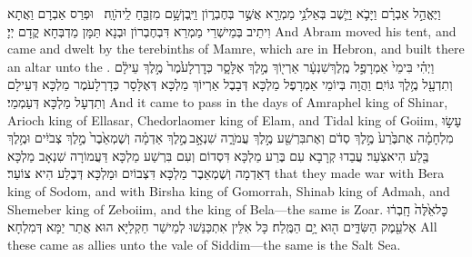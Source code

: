 {וַיֶּאֱהַ֣ל אַבְרָ֗ם וַיָּבֹ֛א וַיֵּ֛שֶׁב בְּאֵלֹנֵ֥י מַמְרֵ֖א אֲשֶׁ֣ר בְּחֶבְר֑וֹן וַיִּֽבֶן\maqqaf שָׁ֥ם מִזְבֵּ֖חַ לַֽיהֹוָֽה׃ \petucha }
{וּפְרַס אַבְרָם וַאֲתָא וִיתֵיב בְּמֵישְׁרֵי מַמְרֵא דִּבְחֶבְרוֹן וּבְנָא תַּמָּן מַדְבְּחָא קֳדָם יְיָ׃}
{And Abram moved his tent, and came and dwelt by the terebinths of Mamre, which are in Hebron, and built there an altar unto the \lord.}{}
\newperek
\newseder
{}%
{וַיְהִ֗י בִּימֵי֙ אַמְרָפֶ֣ל מֶֽלֶךְ\maqqaf שִׁנְעָ֔ר אַרְי֖וֹךְ מֶ֣לֶךְ אֶלָּסָ֑ר כְּדׇרְלָעֹ֙מֶר֙ מֶ֣לֶךְ עֵילָ֔ם וְתִדְעָ֖ל מֶ֥לֶךְ גּוֹיִֽם׃}
{וַהֲוָה בְּיוֹמֵי אַמְרָפֶל מַלְכָּא דְּבָבֶל אַרְיוֹךְ מַלְכָּא דְּאֶלָּסָר כְּדָרְלָעֹמֶר מַלְכָּא דְּעֵילָם וְתִדְעָל מַלְכָּא דְּעַמְמֵי׃}
{And it came to pass in the days of Amraphel king of Shinar, Arioch king of Ellasar, Chedorlaomer king of Elam, and Tidal king of Goiim,}{}
{עָשׂ֣וּ מִלְחָמָ֗ה אֶת\maqqaf בֶּ֙רַע֙ מֶ֣לֶךְ סְדֹ֔ם וְאֶת\maqqaf בִּרְשַׁ֖ע מֶ֣לֶךְ עֲמֹרָ֑ה שִׁנְאָ֣ב \legarmeh  מֶ֣לֶךְ אַדְמָ֗ה וְשֶׁמְאֵ֙בֶר֙ מֶ֣לֶךְ צְבֹיִ֔ים וּמֶ֥לֶךְ בֶּ֖לַע הִיא\maqqaf צֹֽעַר׃}
{עֲבַדוּ קְרָבָא עִם בֶּרַע מַלְכָּא דִּסְדוֹם וְעִם בִּרְשַׁע מַלְכָּא דַּעֲמוֹרָה שִׁנְאָב מַלְכָּא דְּאַדְמָה וְשֶׁמְאֵבֶר מַלְכָּא דִּצְבוֹיִם וּמַלְכָּא דְּבֶלַע הִיא צוֹעַר׃}
{that they made war with Bera king of Sodom, and with Birsha king of Gomorrah, Shinab king of Admah, and Shemeber king of Zeboiim, and the king of Bela—the same is Zoar.}{}
{כׇּל\maqqaf אֵ֙לֶּה֙ חָֽבְר֔וּ אֶל\maqqaf עֵ֖מֶק הַשִּׂדִּ֑ים ה֖וּא יָ֥ם הַמֶּֽלַח׃}
{כָּל אִלֵּין אִתְכַּנַּשׁוּ לְמֵישַׁר חַקְלַיָּא הוּא אֲתַר יַמָּא דְּמִלְחָא׃}
{All these came as allies unto the vale of Siddim—the same is the Salt Sea.}{}
